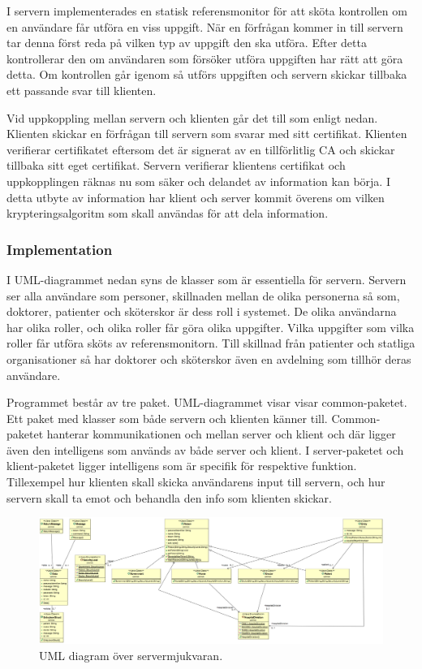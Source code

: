 \documentclass[a4paper]{article}
\begin{document}
I servern implementerades en statisk referensmonitor för att sköta kontrollen om en användare får utföra en viss uppgift. När en förfrågan kommer in till servern tar denna först reda på vilken typ av uppgift den ska utföra. Efter detta kontrollerar den om användaren som försöker utföra uppgiften har rätt att göra detta. Om kontrollen går igenom så utförs uppgiften och servern skickar tillbaka ett passande svar till klienten. 

Vid uppkoppling mellan servern och klienten går det till som enligt nedan. 
Klienten skickar en förfrågan till servern som svarar med sitt certifikat. 
Klienten verifierar certifikatet eftersom det är signerat av en tillförlitlig CA och skickar tillbaka sitt eget certifikat. 
Servern verifierar klientens certifikat och uppkopplingen räknas nu som säker och delandet av information kan börja. 
I detta utbyte av information har klient och server kommit överens om vilken krypteringsalgoritm som skall användas för att dela information. 

\subsubsection{Implementation}
I UML-diagrammet nedan syns de klasser som är essentiella för servern. Servern ser alla användare som personer, skillnaden mellan de olika personerna så som, doktorer, patienter och sköterskor är dess roll i systemet. De olika användarna har olika roller, och olika roller får göra olika uppgifter. Vilka uppgifter som vilka roller får utföra sköts av referensmonitorn. Till skillnad från patienter och statliga organisationer så har doktorer och sköterskor även en avdelning som tillhör deras användare. 

Programmet består av tre paket. UML-diagrammet visar visar common-paketet. Ett paket med klasser som både servern och klienten känner till. Common-paketet hanterar kommunikationen och mellan server och klient och där ligger även den intelligens som används av både server och klient. 
I server-paketet och klient-paketet ligger intelligens som är specifik för respektive funktion. Tillexempel hur klienten skall skicka användarens input till servern, och hur servern skall ta emot och behandla den info som klienten skickar.

\begin{figure}[H]
	\centering
	\includegraphics[width=1.0\textwidth]{uml.png}
	\caption{UML diagram över servermjukvaran.}	
	\label{bild}
\end{figure}
\end{document}
